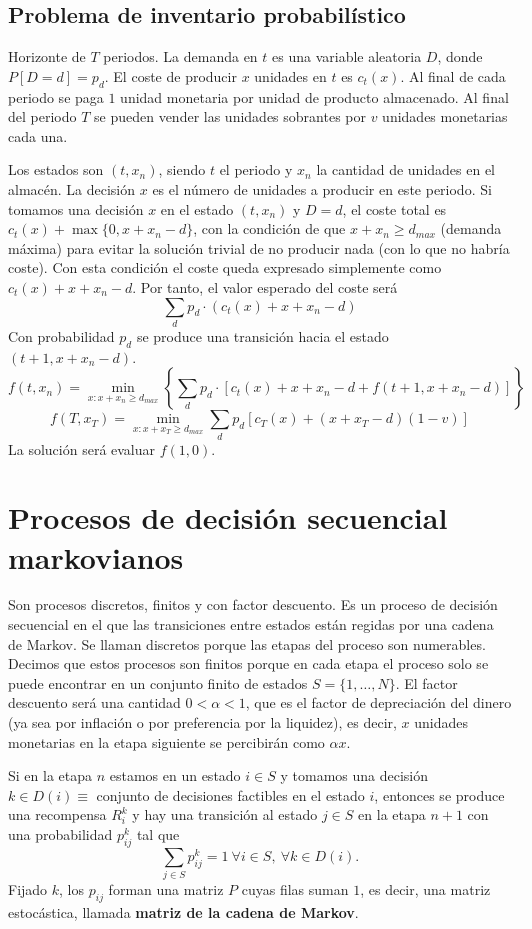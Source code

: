 \documentclass[MIOP.tex]{subfiles}
\begin{document}
\subsection{Problema de inventario probabilístico}

Horizonte de $T$ periodos. La demanda en $t$ es una variable aleatoria $D$, donde $P[D=d]=p_d$. El coste de producir $x$ unidades en $t$ es $c_t(x)$. Al final de cada periodo se paga $1$ unidad monetaria por unidad de producto almacenado. Al final del periodo $T$ se pueden vender las unidades sobrantes por $v$ unidades monetarias cada una.

Los estados son $(t,x_n)$, siendo $t$ el periodo y $x_n$ la cantidad de unidades en el almacén. La decisión $x$ es el número de unidades a producir en este periodo. Si tomamos una decisión $x$ en el estado $(t,x_n)$ y $D=d$, el coste total es $c_t(x)+\max\{0,x+x_n-d\}$, con la condición de que $x+x_n\geq d_{max}$ (demanda máxima) para evitar la solución trivial de no producir nada (con lo que no habría coste). Con esta condición el coste queda expresado simplemente como $c_t(x)+x+x_n-d$. Por tanto, el valor esperado del coste será
$$\sum_d p_d\cdot(c_t(x)+x+x_n-d)$$
Con probabilidad $p_d$ se produce una transición hacia el estado $(t+1,x+x_n-d)$. 
$$f(t,x_n)=\min_{x:x+x_n\geq d_{max}}\left\{\sum_d p_d\cdot[c_t(x)+x+x_n-d+f(t+1,x+x_n-d)]\right\}$$
$$f(T,x_T)=\min_{x:x+x_T\geq d_{max}}\sum_d p_d[c_T(x)+(x+x_T-d)(1-v)]$$
La solución será evaluar $f(1,0)$.

\section{Procesos de decisión secuencial markovianos}
Son procesos discretos, finitos y con factor descuento. Es un proceso de decisión secuencial en el que las transiciones entre estados están regidas por una cadena de Markov. Se llaman discretos porque las etapas del proceso son numerables. Decimos que estos procesos son finitos porque en cada etapa el proceso solo se puede encontrar en un conjunto finito de estados $S=\{1,\dots, N\}$. El factor descuento será una cantidad $0<\alpha <1$, que es el factor de depreciación del dinero (ya sea por inflación o por preferencia por la liquidez), es decir, $x$ unidades monetarias en la etapa siguiente se percibirán como $\alpha x$. 

Si en la etapa $n$ estamos en un estado $i\in S$ y tomamos una decisión $k\in D(i)\equiv$ conjunto de decisiones factibles en el estado $i$, entonces se produce una recompensa $R^k_i$ y hay una transición al estado $j\in S$ en la etapa $n+1$ con una probabilidad $p_{ij}^k$ tal que 
$$\sum_{j\in S}p_{ij}^k=1\ \forall i\in S,\ \forall k\in D(i).$$
Fijado $k$, los $p_{ij}$ forman una matriz $P$ cuyas filas suman $1$, es decir, una matriz estocástica, llamada \textbf{matriz de la cadena de Markov}.
\end{document}
